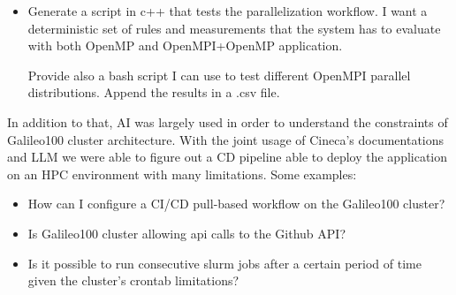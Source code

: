 \documentclass{article}
\begin{document}
\begin{itemize}
    \item Generate a script in c++ that tests the parallelization workflow. I want a deterministic set of rules and measurements that the system has to evaluate with both OpenMP and OpenMPI+OpenMP application. 
    
    Provide also a bash script I can use to test different OpenMPI parallel distributions. Append the results in a .csv file.
\end{itemize}

In addition to that, AI was largely used in order to understand the constraints of Galileo100 cluster architecture. With the joint usage of Cineca's documentations and LLM we were able to figure out a CD pipeline able to deploy the application on an HPC environment with many limitations. Some examples:

\begin{itemize}
    \item How can I configure a CI/CD pull-based workflow on the Galileo100 cluster?
    \item Is Galileo100 cluster allowing api calls to the Github API?
    \item Is it possible to run consecutive slurm jobs after a certain period of time given the cluster's crontab limitations?
\end{itemize}
\end{document}
